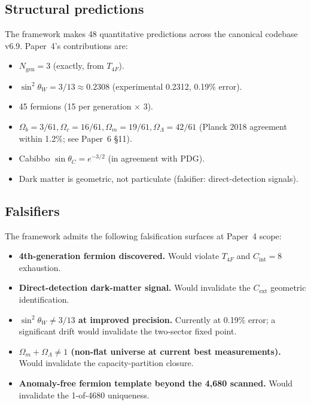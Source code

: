 \documentclass[11pt]{article}
\theoremstyle{definition}
\begin{document}
\subsection{Structural predictions}\label{sec:predictions}

The framework makes 48 quantitative predictions across the canonical codebase v6.9. Paper~4's contributions are:
\begin{itemize}
    \item $N_{\mathrm{gen}} = 3$ (exactly, from $T_{4F}$).
    \item $\sin^2\theta_W = 3/13 \approx 0.2308$ (experimental 0.2312, 0.19\% error).
    \item 45 fermions (15 per generation $\times$ 3).
    \item $\Omega_b = 3/61, \Omega_c = 16/61, \Omega_m = 19/61, \Omega_\Lambda = 42/61$ (Planck 2018 agreement within 1.2\%; see Paper~6 \S11).
    \item Cabibbo $\sin\theta_C = e^{-3/2}$ (in agreement with PDG).
    \item Dark matter is geometric, not particulate (falsifier: direct-detection signals).
\end{itemize}

\subsection{Falsifiers}\label{sec:falsifiers}

The framework admits the following falsification surfaces at Paper~4 scope:
\begin{itemize}
    \item \textbf{4th-generation fermion discovered.} Would violate $T_{4F}$ and $C_{\mathrm{int}} = 8$ exhaustion.
    \item \textbf{Direct-detection dark-matter signal.} Would invalidate the $C_{\mathrm{ext}}$ geometric identification.
    \item \textbf{$\sin^2\theta_W \neq 3/13$ at improved precision.} Currently at 0.19\% error; a significant drift would invalidate the two-sector fixed point.
    \item \textbf{$\Omega_m + \Omega_\Lambda \neq 1$ (non-flat universe at current best measurements).} Would invalidate the capacity-partition closure.
    \item \textbf{Anomaly-free fermion template beyond the 4,680 scanned.} Would invalidate the 1-of-4680 uniqueness.
\end{itemize}
\end{document}
